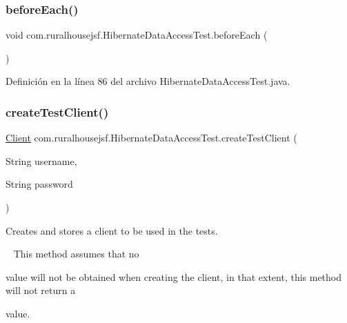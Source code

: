 \mbox{\label{a00272_a45f50c1176ffaef90f33dccb27e03cdd}} 
\subsubsection{\texorpdfstring{beforeEach()}{beforeEach()}}
{\footnotesize\ttfamily void com.\+ruralhousejsf.\+Hibernate\+Data\+Access\+Test.\+before\+Each (\begin{DoxyParamCaption}{ }\end{DoxyParamCaption})\hspace{0.3cm}{\ttfamily [package]}}



Definición en la línea 86 del archivo Hibernate\+Data\+Access\+Test.\+java.

\mbox{\label{a00272_a971c94d6c41317c2cc8de024153f0dc9}} 
\subsubsection{\texorpdfstring{createTestClient()}{createTestClient()}}
{\footnotesize\ttfamily \mbox{\hyperlink{a00164}{Client}} com.\+ruralhousejsf.\+Hibernate\+Data\+Access\+Test.\+create\+Test\+Client (\begin{DoxyParamCaption}\item[{String}]{username,  }\item[{String}]{password }\end{DoxyParamCaption})\hspace{0.3cm}{\ttfamily [private]}}



Creates and stores a client to be used in the tests. 

~\newline
 This method assumes that no
\begin{DoxyCode}{0}
\DoxyCodeLine{\textcolor{keyword}{null} }
\end{DoxyCode}
 value will not be obtained when creating the client, in that extent, this method will not return a 
\begin{DoxyCode}{0}
\DoxyCodeLine{\textcolor{keyword}{null} }
\end{DoxyCode}
 value. 

